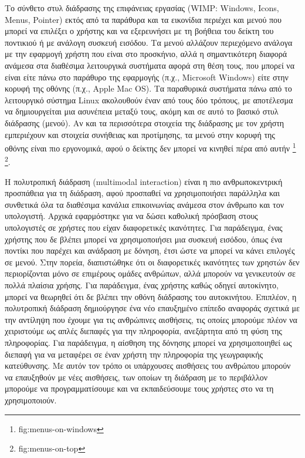 \documentclass[
]{article}
\begin{document}
Το σύνθετο στυλ διάδρασης της επιφάνειας εργασίας (WIMP: Windows, Icons,
Menus, Pointer) εκτός από τα παράθυρα και τα εικονίδια περιέχει και
μενού που μπορεί να επιλέξει ο χρήστης και να εξερευνήσει με τη βοήθεια
του δείκτη του ποντικιού ή με ανάλογη συσκευή εισόδου. Τα μενού αλλάζουν
περιεχόμενο ανάλογα με την εφαρμογή χρήστη που είναι στο προσκήνιο, αλλά
η σημαντικότερη διαφορά ανάμεσα στα διαθέσιμα λειτουργικά συστήματα
αφορά στη θέση τους, που μπορεί να είναι είτε πάνω στο παράθυρο της
εφαρμογής (π.χ., Microsoft Windows) είτε στην κορυφή της οθόνης (π.χ.,
Apple Mac OS). Τα παραθυρικά συστήματα πάνω από το λειτουργικό σύστημα
Linux ακολουθούν έναν από τους δύο τρόπους, με αποτέλεσμα να
δημιουργείται μια ασυνέπεια μεταξύ τους, ακόμη και σε αυτό το βασικό
στυλ διάδρασης (μενού). Αν και τα περισσότερα στοιχεία της διάδρασης με
τον χρήστη εμπεριέχουν και στοιχεία συνήθειας και προτίμησης, τα μενού
στην κορυφή της οθόνης είναι πιο εργονομικά, αφού ο δείκτης δεν μπορεί
να κινηθεί πέρα από αυτήν \footnote{fig:menus-on-windows} \footnote{fig:menus-on-top}.

Η πολυτροπική διάδραση (multimodal interaction) είναι η πιο
ανθρωποκεντρική προσπάθεια για τη διάδραση, αφού προσπαθεί να
χρησιμοποιήσει παράλληλα και συνθετικά όλα τα διαθέσιμα κανάλια
επικοινωνίας ανάμεσα στον άνθρωπο και τον υπολογιστή. Αρχικά εφαρμόστηκε
για να δώσει καθολική πρόσβαση στους υπολογιστές σε χρήστες που είχαν
διαφορετικές ικανότητες. Για παράδειγμα, ένας χρήστης που δε βλέπει
μπορεί να χρησιμοποιήσει μια συσκευή εισόδου, όπως ένα ποντίκι που
παρέχει και ανάδραση με δόνηση, έτσι ώστε να μπορεί να κάνει επιλογές σε
μενού. Στην πορεία, διαπιστώθηκε ότι οι διαφορετικές ικανότητες των
χρηστών δεν περιορίζονται μόνο σε επιμέρους ομάδες ανθρώπων, αλλά
μπορούν να γενικευτούν σε πολλά πλαίσια χρήσης. Για παράδειγμα, ένας
χρήστης καθώς οδηγεί αυτοκίνητο, μπορεί να θεωρηθεί ότι δε βλέπει την
οθόνη διάδρασης του αυτοκινήτου. Επιπλέον, η πολυτροπική διάδραση
δημιούργησε ένα νέο επαυξημένο επίπεδο αναφοράς σχετικά με την αντίληψη
που έχουμε για τις ανθρώπινες αισθήσεις, τις οποίες μπορούμε πλέον να
χειριστούμε ως απλές διεπαφές για την πληροφορία, ανεξάρτητα από τη φύση
της πληροφορίας. Για παράδειγμα, η αίσθηση της δόνησης μπορεί να
χρησιμοποιηθεί ως διεπαφή για να μεταφέρει σε έναν χρήστη την πληροφορία
της γεωγραφικής κατεύθυνσης. Με αυτόν τον τρόπο οι υπάρχουσες αισθήσεις
του ανθρώπου μπορούν να επαυξηθούν με νέες αισθήσεις, των οποίων τη
διάδραση με το περιβάλλον μπορούμε να προγραμματίσουμε και να
εκπαιδεύσουμε τους χρήστες στο να τη χρησιμοποιούν.
\end{document}
